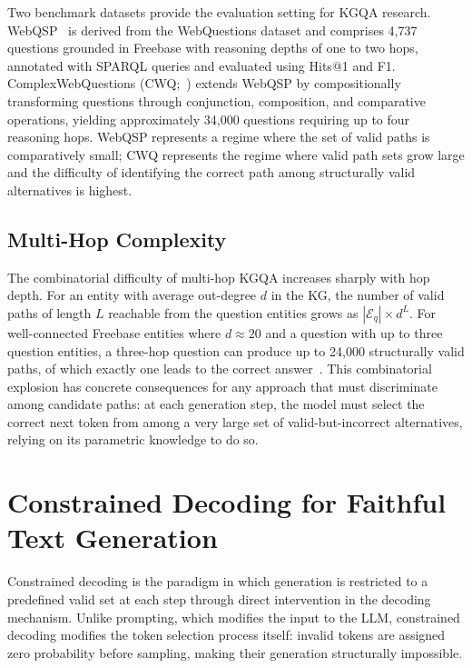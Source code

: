 Two benchmark datasets provide the evaluation setting for KGQA research. WebQSP~\citep{yih2016websqp} is derived from the WebQuestions dataset and comprises 4,737 questions grounded in Freebase with reasoning depths of one to two hops, annotated with SPARQL queries and evaluated using Hits@1 and F1. ComplexWebQuestions (CWQ;~\citealt{talmor2018cwq}) extends WebQSP by compositionally transforming questions through conjunction, composition, and comparative operations, yielding approximately 34,000 questions requiring up to four reasoning hops. WebQSP represents a regime where the set of valid paths is comparatively small; CWQ represents the regime where valid path sets grow large and the difficulty of identifying the correct path among structurally valid alternatives is highest.

\subsection{Multi-Hop Complexity}

The combinatorial difficulty of multi-hop KGQA increases sharply with hop depth. For an entity with average out-degree $d$ in the KG, the number of valid paths of length $L$ reachable from the question entities grows as $|\mathcal{E}_q| \times d^L$. For well-connected Freebase entities where $d \approx 20$ and a question with up to three question entities, a three-hop question can produce up to 24{,}000 structurally valid paths, of which exactly one leads to the correct answer~\citep{he2021multihop, lan2022kgqa}. This combinatorial explosion has concrete consequences for any approach that must discriminate among candidate paths: at each generation step, the model must select the correct next token from among a very large set of valid-but-incorrect alternatives, relying on its parametric knowledge to do so.

\section{Constrained Decoding for Faithful Text Generation}
\label{sec:constrained}

Constrained decoding is the paradigm in which generation is restricted to a predefined valid set at each step through direct intervention in the decoding mechanism. Unlike prompting, which modifies the input to the LLM, constrained decoding modifies the token selection process itself: invalid tokens are assigned zero probability before sampling, making their generation structurally impossible.

